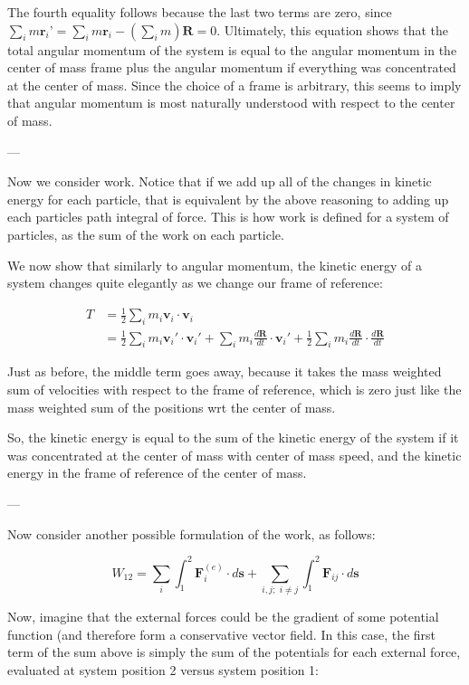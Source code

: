 \documentclass{article}
\begin{document}
The fourth equality follows because the last two terms are zero, since $\sum_i m \mathbf{r}_i’ = \sum_i m\mathbf{r}_i - (\sum_i m)\mathbf{R} = 0$. Ultimately, this equation shows that the total angular momentum of the system is equal to the angular momentum in the center of mass frame plus the angular momentum if everything was concentrated at the center of mass. Since the choice of a frame is arbitrary, this seems to imply that angular momentum is most naturally understood with respect to the center of mass.

---

Now we consider work. Notice that if we add up all of the changes in kinetic energy for each particle, that is equivalent by the above reasoning to adding up each particles path integral of force. This is how work is defined for a system of particles, as the sum of the work on each particle.

We now show that similarly to angular momentum, the kinetic energy of a system changes quite elegantly as we change our frame of reference:

 

$$
\begin{align*}
T &= \frac{1}{2}\sum_i m_i \mathbf{v}_i \cdot \mathbf{v}_i\\
&= \frac{1}{2}\sum_i m_i \mathbf{v}_i' \cdot \mathbf{v}_i' + \sum_i m_i \frac{d\mathbf{R}}{dt} \cdot \mathbf{v}_i' + \frac{1}{2}\sum_i m_i \frac{d\mathbf{R}}{dt} \cdot \frac{d\mathbf{R}}{dt}
\end{align*}
$$

Just as before, the middle term goes away, because it takes the mass weighted sum of velocities with respect to the frame of reference, which is zero just like the mass weighted sum of the positions wrt the center of mass. 

So, the kinetic energy is equal to the sum of the kinetic energy of the system if it was concentrated at the center of mass with center of mass speed, and the kinetic energy in the frame of reference of the center of mass. 

---

Now consider another possible formulation of the work, as follows:

$$
W_{12} = \sum_i\int_1^2 \mathbf{F}_i^{(e)}\cdot d\mathbf{s} + \sum_{i, j; \,\, i\neq j}\int_1^2 \mathbf{F}_{ij}\cdot d\mathbf{s}
$$

Now, imagine that the external forces could be the gradient of some potential function (and therefore form a conservative vector field. In this case, the first term of the sum above is simply the sum of the potentials for each external force, evaluated at system position 2 versus system position 1:
\end{document}
